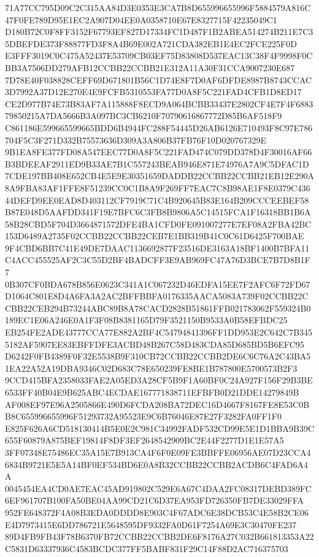 \documentclass[UTF8,fontset=fandol,zihao=-4,a4paper]{ctexart}
\begin{document}
{{71A77CC795D09C2C315AA84D3E0353E3CA7B8D655996655996F5884579A816C47F0FE789D95E1EC2A907D04EE0A0358710E67E8327715F42235049C1
D180B72C0F8FF3152F67793EF827D17334FC1D487F1B2ABEA514274B211E7C35DBEFDE373F88877FD3F8A4B69E002A721CDA382EB1E4EC2FCE225F0D
E3FFF3019C0C475A52437E53709CB03EF75D83808D537EAC13C38F4F9998F0CBB3A7506DD279AFB12CCBB22CCBB21E312A11A30F31CCA9007230E687
7D78E40F038828CEFF69D671801B56C1D74E8F7D0AF6DFDE8987B8743CCAC3D7992A37D12E270E4E9FCFB5310553FA77D0A8F5C221FAD4CFB1D8ED17
CE2D977B74E73B83AF7A115888F8ECD9A064BCBB33437E2802CF4E7F4F688379850215A7DA5666B3A097BC3CB6210F70790616867772D85B6AF518F9
C861186E599665599665BDD6B4944FC288F54445D26AB6126E710493F8C97E786704F5C3F271D332B75573636D309A3A806B37FB76F10D020767329E
9B1EA8FE377FD08A547EEC77D0A8F5C221FAD474C079DD378D4F30016AF66B3BDEEAF2911ED9B33AE7B1C557243BEAB946E871E74976A7A9C5DFAC1D
7CDE197BB408E652CB4E5E9E30351659DADDB22CCBB22CCBB21EB12E290A8A9FBA83AF1FFE8F51239CC0C1B8A9F269FF7EAC7C8B98AE1F8E0379C436
44DEFD9EE0EAD8D403112CF7919C71C4B920645B83E164B209CCCEEBEF58B87E048D5AAFDD341F19E7BFC6C3FB8B9806A5C14515FCA1F16318BB1B6A
58B28CBD5F704D3664871572DFE4BA1CFD0FE091007277E7EF08A2FBA42BC153D6489A2735F02CCBB22CCBB22CEB7E1BB319B41C0C61D6425F700BAE
9F4CBD6BB7C41E49DE7DAAC1136692877F23516DE3163A18BF1400B7BFA11C4ACC455525AF2C3C55D2BF4BADCFF3E9AB969FC47A76D3BCE7B7D8B1F7
0B307CF0BDA678B856E0623C341A1C067232D46EDFA15EE7F2AFC6F72FD67D1064C801E8D4A6FA3A2AC2BFFBBFA0176335AACA5083A739F02CCBB22C
CBB22CEB294B73244ABC89B8A78CACD2828B51861FFB021783062F559324B0189EC1E06A246E0A1F3F08B8381165D79F3521150B9533A0B58EFBDC25
EB254FE2ADE43777CCA77E882A2BF4C54794841396FF1DD953E2C642C7B3455182AF5907EE83EBFFDFE3ACBD48B267C58D483CDA85D685BD5B6EFC95
D6242F0FB4389F0F32E5538B9F310CB72CCBB22CCBB2DE6C6C76A2C43BA51EA22A52A19DBA9346C02D683C78E650239FE8BE1B787800E5700573B2F3
9CCD415BFA2358033FAE2A05ED3A28CF5B9F1A60BF0C24A927F156F29B3BE6533FF40B04E9B625ABC4ECDAE167771838711EFBFB0D21DDE14279849B
AF008EF97E96A2505866E490D6FCDA208BA72DEC16D4667F8167FE8E53C0BB8C655996655996F51293732A95523E9C6B76046E87E27F3282FA0FF1F0
E825F626A6CD518130414B5E0E2C981C34992FADF532CD99E5E1D1BBA9B39C655F60879A875BEF19814F8DF3EF2648542909BC2E44F2277D1E1E57A5
3FF07348E75486EC35A15E7B913CA4F6F0E09FE3BBFFE06956AE07D23CCA46834B9721E5E5A14BF0EF534BD6E0A8B32CCBB22CCBB2ACDB6C4FAD6A4A
0045454EA4CD0AE7EAC45AD919802C529E6A67C4DAA2FC08317DEBD389FC6EF961707B100FA50BE04AA99CD21C6D37EA953FD726350FB7DE33029FFA
952FE648372F4A08B3EDA0DDDD8E903C4F67ADC6E38DCB53C4E58B2CE06E4D7973415E6DD786721E5648595DF9332FA0D61F7254A69E3C30470FE237
89D4FB9FB43F78B6370FB72CCBB22CCBB2DE6F8176A27C032B661813353A22C5831D63337936C4583BCDC377FF5BABF831F29C14F88D2AC716375703
}}
\end{document}
